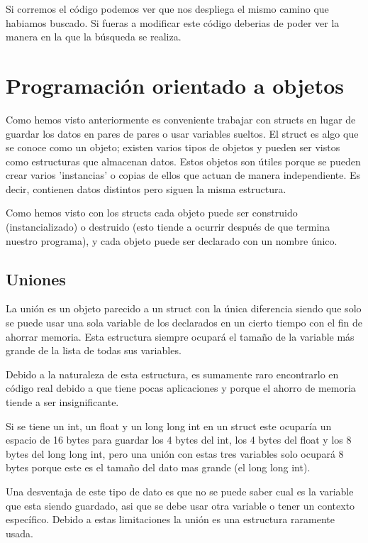 \documentclass{article}
\begin{document}
Si corremos el código podemos ver que nos despliega el mismo camino que habiamos buscado. Si fueras a modificar este código deberias de poder ver la manera en la que la búsqueda se realiza.

\section{Programación orientado a objetos}

Como hemos visto anteriormente es conveniente trabajar con structs en lugar de guardar los datos en pares de pares o usar variables sueltos. El struct es algo que se conoce como un objeto; existen varios tipos de objetos y pueden ser vistos como estructuras que almacenan datos. Estos objetos son útiles porque se pueden crear varios 'instancias' o copias de ellos que actuan de manera independiente. Es decir, contienen datos distintos pero siguen la misma estructura.

Como hemos visto con los structs cada objeto puede ser construido (instancializado) o destruido (esto tiende a ocurrir después de que termina nuestro programa), y cada objeto puede ser declarado con un nombre único.

\subsection{Uniones}

La unión es un objeto parecido a un struct con la única diferencia siendo que solo se puede usar una sola variable de los declarados en un cierto tiempo con el fin de ahorrar memoria. Esta estructura siempre ocupará el tamaño de la variable más grande de la lista de todas sus variables.

Debido a la naturaleza de esta estructura, es sumamente raro encontrarlo en código real debido a que tiene pocas aplicaciones y porque el ahorro de memoria tiende a ser insignificante.

Si se tiene un int, un float y un long long int en un struct este ocuparía un espacio de 16 bytes para guardar los 4 bytes del int, los 4 bytes del float y los 8 bytes del long long int, pero una unión con estas tres variables solo ocupará 8 bytes porque este es el tamaño del dato mas grande (el long long int).

Una desventaja de este tipo de dato es que no se puede saber cual es la variable que esta siendo guardado, asi que se debe usar otra variable o tener un contexto específico. Debido a estas limitaciones la unión es una estructura raramente usada.
\end{document}
